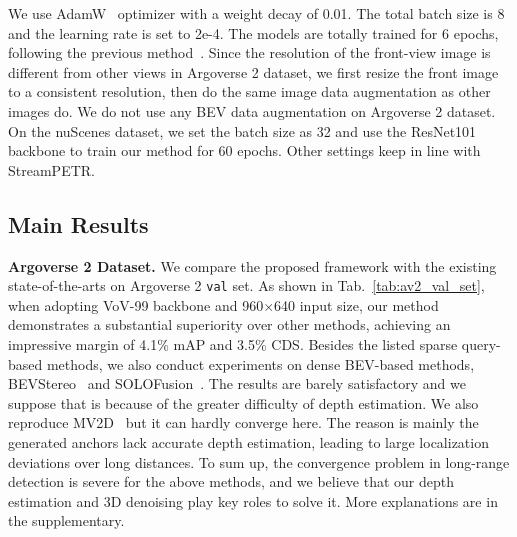 \documentclass[letterpaper]{article} \usepackage{aaai24}
\begin{document}
We use AdamW~\cite{loshchilov2017decoupled} optimizer with a weight decay of 0.01. The total batch size is 8 and the learning rate is set to 2e-4. 
The models are totally trained for 6 epochs, following the previous method~\cite{chen2023voxelnext}. Since the resolution of the front-view image is different from other views in Argoverse 2 dataset, we first resize the front image to a consistent resolution, then do the same image data augmentation as other images do. We do not use any BEV data augmentation on Argoverse 2 dataset. On the nuScenes dataset, we set the batch size as 32 and use the ResNet101~\cite{he2016resnet} backbone to train our method for 60 epochs. Other settings keep in line with StreamPETR.


\subsection{Main Results}
\noindent\textbf{Argoverse 2 Dataset.}
We compare the proposed framework with the existing state-of-the-arts on Argoverse 2 \texttt{val} set. As shown in Tab.~\ref{tab:av2_val_set}, when adopting VoV-99 backbone and 960$\times$640 input size, our method demonstrates a substantial superiority over other methods, achieving an impressive margin of 4.1\% mAP and 3.5\% CDS.
Besides the listed sparse query-based methods, we also conduct experiments on dense BEV-based methods, BEVStereo~\cite{li2022bevstereo} and SOLOFusion~\cite{park2022time}. The results are barely satisfactory and we suppose that is because of the greater difficulty of depth estimation. We also reproduce MV2D~\cite{wang2023object} but it can hardly converge here. The reason is mainly the generated anchors lack accurate depth estimation, leading to large localization deviations over long distances.
To sum up, the convergence problem in long-range detection is severe for the above methods, and we believe that our depth estimation and 3D denoising play key roles to solve it. More explanations are in the supplementary.
\end{document}
